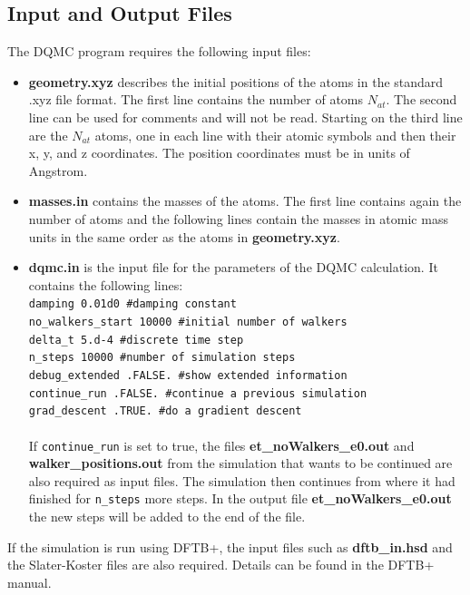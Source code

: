 \documentclass [12pt]{report}
\begin{document}
\begin{appendices}
\chapter{Input and Output Files} \label{inout}
The DQMC program requires the following input files:
\begin{itemize}
\item \textbf{geometry.xyz} describes the initial positions of the atoms in the standard .xyz file format. The first line contains the number of atoms $N_{at}$. The second line can be used for comments and will not be read. Starting on the third line are the $N_{at}$ atoms, one in each line with their atomic symbols and then their x, y, and z coordinates. The position coordinates must be in units of Angstrom.
\item \textbf{masses.in} contains the masses of the atoms. The first line contains again the number of atoms and the following lines contain the masses in atomic mass units in the same order as the atoms in \textbf{geometry.xyz}.
\item \textbf{dqmc.in} is the input file for the parameters of the DQMC calculation. It contains the following lines:\\
\verb+damping 0.01d0 #damping constant+\\
\verb+no_walkers_start 10000 #initial number of walkers+\\
\verb+delta_t 5.d-4 #discrete time step+\\
\verb+n_steps 10000 #number of simulation steps+\\
\verb+debug_extended .FALSE. #show extended information+\\
\verb+continue_run .FALSE. #continue a previous simulation+\\
\verb+grad_descent .TRUE. #do a gradient descent+\\
\\
If \verb+continue_run+ is set to true, the files \textbf{et\_noWalkers\_e0.out} and \textbf{walker\_positions.out} from the simulation that wants to be continued are also required as input files. The simulation then continues from where it had finished for \verb+n_steps+ more steps. In the output file \textbf{et\_noWalkers\_e0.out} the new steps will be added to the end of the file.
\end{itemize}
If the simulation is run using DFTB+, the input files such as \textbf{dftb\_in.hsd} and the Slater-Koster files are also required. Details can be found in the DFTB+ manual\cite{dftbp_manual}.\\


\end{appendices}
\end{document}
